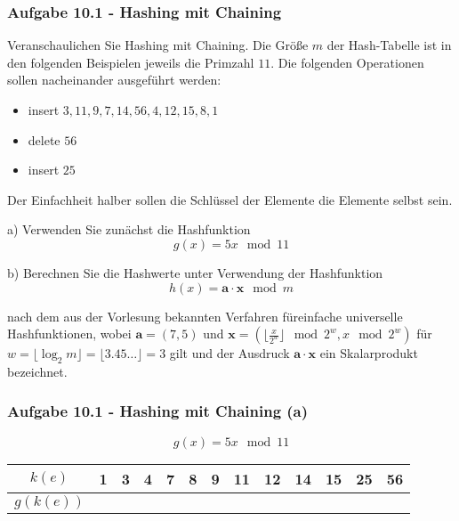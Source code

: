 \begin{frame}
    \frametitle{Aufgabe 10.1 - Hashing mit Chaining}
    \scriptsize
    Veranschaulichen Sie Hashing mit Chaining. Die Größe $m$ der Hash-Tabelle ist in den folgenden Beispielen jeweils die Primzahl $11$. Die folgenden Operationen sollen nacheinander ausgeführt werden:
    \begin{itemize}
      \item insert $3, 11, 9, 7, 14, 56, 4, 12, 15, 8, 1$
      \item delete $56$
      \item insert $25$
    \end{itemize}
    Der Einfachheit halber sollen die Schlüssel der Elemente die Elemente selbst sein.
  
    \medskip
  
    a) Verwenden Sie zunächst die Hashfunktion
    $$g(x) = 5x \mod 11$$
  
    b) Berechnen Sie die Hashwerte unter Verwendung der Hashfunktion
    $$h(x) = \mathbf{a} \cdot \mathbf{x} \mod m$$
  
    nach dem aus der Vorlesung bekannten Verfahren füreinfache universelle Hashfunktionen,
    wobei $\mathbf{a} = (7, 5)$ und $\mathbf{x} = (\lfloor \frac{x}{2^w} \rfloor \mod 2^w, x \mod 2^w)$
    für $w = \lfloor \log_2 m \rfloor = \lfloor 3.45 \dots \rfloor = 3$ gilt
    und der Ausdruck $\mathbf{a} \cdot \mathbf{x}$ ein Skalarprodukt bezeichnet.
  
  \end{frame}
  
  \begin{frame}[t]
    \frametitle{Aufgabe 10.1 - Hashing mit Chaining (a)}
  
    $$g(x) = 5x \mod 11$$
  
    \bigskip
    \bigskip
    \bigskip
    \bigskip
    \bigskip
    \bigskip
    \bigskip
    \bigskip
    \bigskip
    \bigskip
  
    \begin{center}
      \begin{tabular}{c|c|c|c|c|c|c|c|c|c|c|c|c}
        $k(e)$    & 1 & 3 & 4 & 7 & 8 & 9 & 11 & 12 & 14 & 15 & 25 & 56 \\
        \hline
        $g(k(e))$ &   &   &   &   &   &   &    &    &    &    &    &    \\
      \end{tabular}
    \end{center}
  \end{frame}
  
